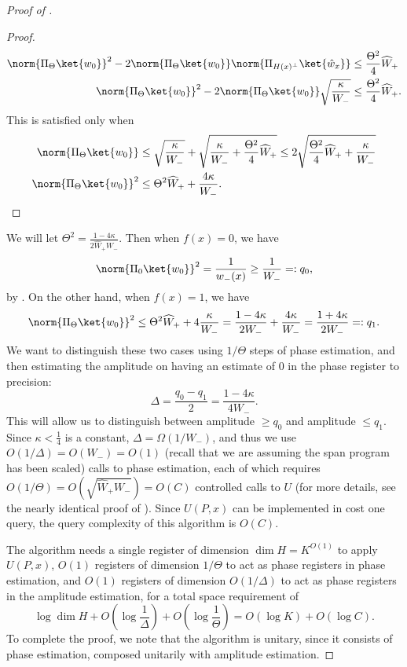 \documentclass[11pt]{article}
\numberwithin{equation}{section}
\theoremstyle{definition}
\theoremstyle{plain}
\begin{document}
\begin{proof}[Proof of ]
\begin{proof}
\begin{align*}
\norm{\Pi_{\Theta}\ket{w_0}}^2 -2\norm{\Pi_\Theta\ket{w_0}}\norm{\Pi_{H(x)^\bot}\ket{\hat{w}_x}} &\leq  \frac{\Theta^2}{4}\widehat{W}_+\\
\norm{\Pi_{\Theta}\ket{w_0}}^2 -2\norm{\Pi_\Theta\ket{w_0}}\sqrt{\frac{\kappa}{W_-}} &\leq  \frac{\Theta^2}{4}\widehat{W}_+.
\end{align*}
This is satisfied only when 
\begin{align*}
\norm{\Pi_\Theta\ket{w_0}} &\leq  \sqrt{\frac{\kappa}{W_-}}+\sqrt{\frac{\kappa}{W_-}+\frac{\Theta^2}{4}\widehat{W}_+}
\leq  2\sqrt{\frac{\Theta^2}{4}\widehat{W}_+ + \frac{\kappa}{W_-}}\\
\norm{\Pi_\Theta\ket{w_0}}^2 &\leq  \Theta^2\widehat{W}_+ + \frac{4\kappa }{W_-}. \qedhere
\end{align*}
\end{proof}

We will let $\Theta^2=\frac{1-4\kappa}{2\widehat{W}_+W_-}$. Then when $f(x)=0$, we have
$$\norm{\Pi_0\ket{w_0}}^2=\frac{1}{w_-(x)}\geq \frac{1}{W_-}=:q_0,$$
by \cite[Lemma 3.3]{IJ15}. On the other hand, when $f(x)=1$, 
we have %
$$\norm{\Pi_\Theta\ket{w_0}}^2\leq \Theta^2\widehat{W}_++4\frac{\kappa}{W_-}=\frac{1-4\kappa}{2W_-}+\frac{4\kappa}{W_-}= \frac{1+4\kappa}{2W_-}  =:q_1.$$
We want to distinguish these two cases using $1/\Theta$ steps of phase estimation, and then estimating the amplitude on having an estimate of 0 in the phase register to precision:
$$\Delta=\frac{q_0-q_1}{2}=\frac{1-4\kappa}{4W_-}.$$
This will allow us to distinguish between amplitude $\geq q_0$ and amplitude $\leq q_1$.
Since $\kappa<\frac{1}{4}$ is a constant, $\Delta=\Omega(1/W_-)$, and thus we use $O(1/\Delta)=O(W_-)=O(1)$ (recall that we are assuming the span program has been scaled) calls to phase estimation, each of which requires $O(1/\Theta)=O\left(\sqrt{\widehat{W}_+W_-}\right)=O(C)$ controlled calls to $U$ (for more details, see the nearly identical proof of \cite[Lemma 3.2]{IJ15}). Since $U(P,x)$ can be implemented in cost one query, the query complexity of this algorithm is $O(C)$. 

The algorithm needs a single register of dimension $\dim H = K^{O(1)}$ to apply $U(P,x)$, $O(1)$ registers of dimension $1/\Theta$ to act as phase registers in phase estimation, and $O(1)$ registers of dimension $O(1/\Delta)$ to act as phase registers in the amplitude estimation, for a total space requirement of 
$$\log\dim H + O\left(\log\frac{1}{\Delta}\right)+O\left(\log\frac{1}{\Theta}\right)=O(\log K)+O(\log C).$$
To complete the proof, we note that the algorithm is unitary, since it consists of phase estimation, composed unitarily with amplitude estimation.
\end{proof}
\end{document}
